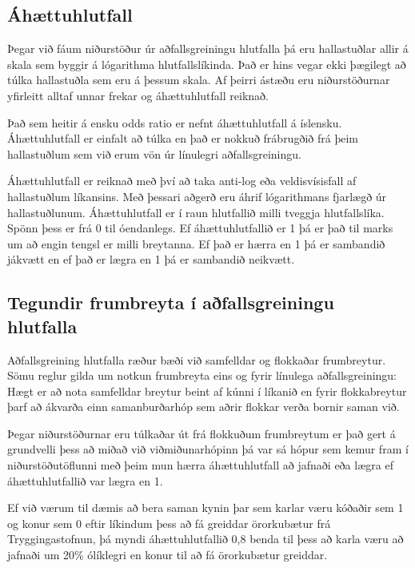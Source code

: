 \documentclass[]{book}
\begin{document}
\hypertarget{uxe1huxe6ttuhlutfall}{%
\subsection{Áhættuhlutfall}\label{uxe1huxe6ttuhlutfall}}

Þegar við fáum niðurstöður úr aðfallsgreiningu hlutfalla þá eru hallastuðlar allir á skala sem byggir á lógarithma hlutfallslíkinda. Það er hins vegar ekki þægilegt að túlka hallastuðla sem eru á þessum skala. Af þeirri ástæðu eru niðurstöðurnar yfirleitt alltaf unnar frekar og áhættuhlutfall reiknað.

Það sem heitir á ensku odds ratio er nefnt áhættuhlutfall á íslensku. Áhættuhlutfall er einfalt að túlka en það er nokkuð frábrugðið frá þeim hallastuðlum sem við erum vön úr línulegri aðfallsgreiningu.

Áhættuhlutfall er reiknað með því að taka anti-log eða veldisvísisfall af hallastuðlum líkansins. Með þessari aðgerð eru áhrif lógarithmans fjarlægð úr hallastuðlunum. Áhættuhlutfall er í raun hlutfallið milli tveggja hlutfallslíka. Spönn þess er frá 0 til óendanlegs. Ef áhættuhlutfallið er 1 þá er það til marks um að engin tengsl er milli breytanna. Ef það er hærra en 1 þá er sambandið jákvætt en ef það er lægra en 1 þá er sambandið neikvætt.

\hypertarget{tegundir-frumbreyta-uxed-auxf0fallsgreiningu-hlutfalla}{%
\subsection{Tegundir frumbreyta í aðfallsgreiningu hlutfalla}\label{tegundir-frumbreyta-uxed-auxf0fallsgreiningu-hlutfalla}}

Aðfallsgreining hlutfalla ræður bæði við samfelldar og flokkaðar frumbreytur. Sömu reglur gilda um notkun frumbreyta eins og fyrir línulega aðfallsgreiningu: Hægt er að nota samfelldar breytur beint af kúnni í líkanið en fyrir flokkabreytur þarf að ákvarða einn samanburðarhóp sem aðrir flokkar verða bornir saman við.

Þegar niðurstöðurnar eru túlkaðar út frá flokkuðum frumbreytum er það gert á grundvelli þess að miðað við viðmiðunarhópinn þá var sá hópur sem kemur fram í niðurstöðutöflunni með þeim mun hærra áhættuhlutfall að jafnaði eða lægra ef áhættuhlutfallið var lægra en 1.

Ef við værum til dæmis að bera saman kynin þar sem karlar væru kóðaðir sem 1 og konur sem 0 eftir líkindum þess að fá greiddar örorkubætur frá Tryggingastofnun, þá myndi áhættuhlutfallið 0,8 benda til þess að karla væru að jafnaði um 20\% ólíklegri en konur til að fá örorkubætur greiddar.
\end{document}
